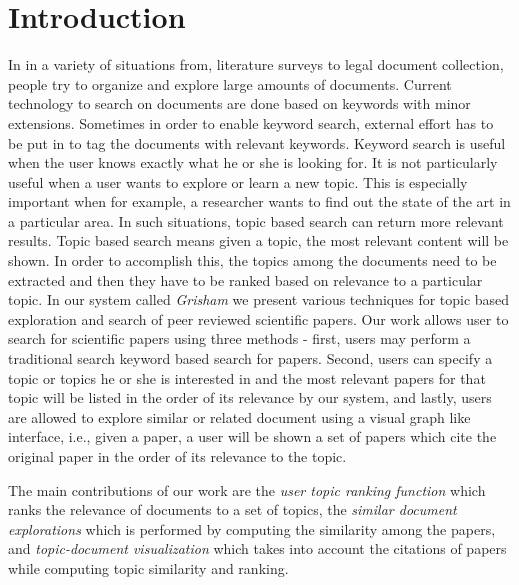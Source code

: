\section{Introduction}

In in a variety of situations from, literature surveys to legal document collection, people try to organize and explore large amounts of documents. Current technology to search on documents are done based on keywords with minor extensions. Sometimes in order to enable keyword search, external effort has to be put in to tag the documents with relevant keywords. Keyword search is useful when the user knows exactly what he or she is looking for. It is not particularly useful when a user wants to explore or learn a new topic. This is especially important when for example, a researcher wants to find out the state of the art in a particular area. In such situations, topic based search can return more relevant results. Topic based search means given a topic, the most relevant content will be shown. In order to accomplish this, the topics among the documents need to be extracted and then they have to be ranked based on relevance to a particular topic. In our system called \emph{Grisham} we present various techniques for topic based exploration and search of peer reviewed scientific papers. Our work allows user to search for scientific papers using three methods - first, users may perform a traditional search keyword based search for papers. Second, users can specify a topic or topics he or she is interested in and the most relevant papers for that topic will be listed in the order of its relevance by our system, and lastly, users are allowed to explore similar or related document using a visual graph like interface, i.e., given a paper, a user will be shown a set of papers which cite the original paper in the order of its relevance to the topic. 


The main contributions of our work are the \emph{user topic ranking function} which ranks the relevance of documents to a set of topics, the \emph{similar document explorations} which is performed by computing the similarity among the papers, and \emph{topic-document visualization} which takes into account the citations of papers while computing topic similarity and ranking.


